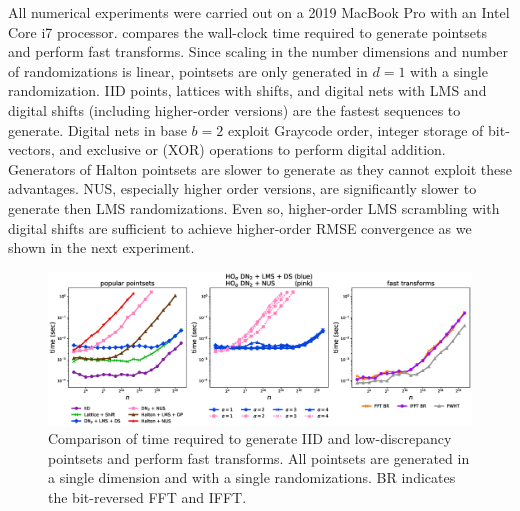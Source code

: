 \documentclass[acmsmall]{acmart}
\begin{document}
All numerical experiments were carried out on a 2019 MacBook Pro with an Intel Core i7 processor.  compares the wall-clock time required to generate pointsets and perform fast transforms. Since scaling in the number dimensions and number of randomizations is linear, pointsets are only generated in $d=1$ with a single randomization. IID points, lattices with shifts, and digital nets with LMS and digital shifts (including higher-order versions) are the fastest sequences to generate. Digital nets in base $b=2$ exploit Graycode order, integer storage of bit-vectors, and exclusive or (XOR) operations to perform digital addition. Generators of Halton pointsets are slower to generate as they cannot exploit these advantages. NUS, especially higher order versions, are significantly slower to generate then LMS randomizations. Even so, higher-order LMS scrambling with digital shifts are sufficient to achieve higher-order RMSE convergence as we shown in the next experiment.  

\begin{figure}%
    \centering
    \includegraphics[width=1\textwidth]{./figs/timing.eps}
    \caption{Comparison of time required to generate IID and low-discrepancy pointsets and perform fast transforms. All pointsets are generated in a single dimension and with a single randomizations. BR indicates the bit-reversed FFT and IFFT.}
    \Description[]{}
    \label{fig:timing}
\end{figure}
\end{document}
